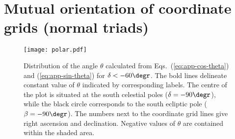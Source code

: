 \documentclass[fleqn,usenatbib,useAMS,usedcolumn]{mnras}
\begin{document}
\section{Mutual orientation of coordinate grids (normal triads)}
\label{app:angle}

\begin{figure}
  \centering
  \texttt{[image: polar.pdf]}
 \caption{Distribution of the angle $\theta$ calculated from Eqs.~(\ref{eq:app-cos-theta}) and (\ref{eq:app-sin-theta}) for $\delta<{-60}\degr$. The bold lines delineate constant value of $\theta$ indicated by corresponding labels. The centre of the plot is situated at the south celestial poles ($\delta=-90\degr$), while the black circle corresponds to the south ecliptic pole ($\beta=-90\degr$). The numbers next to the coordinate grid lines give right ascension and declination. Negative values of  $\theta$ are contained within the shaded area.}
  \label{fig:polar}
\end{figure}
\end{document}
